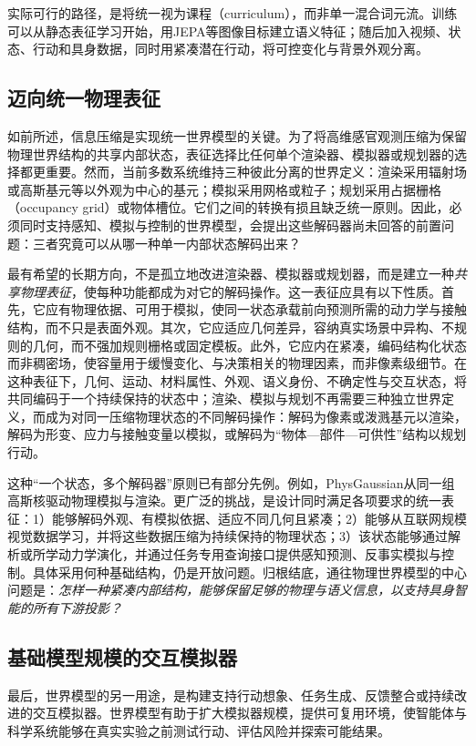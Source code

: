 实际可行的路径，是将统一视为课程（curriculum），而非单一混合词元流。训练可以从静态表征学习开始，用JEPA等图像目标建立语义特征\citep{assran2023ijepa}；随后加入视频、状态、行动和具身数据，同时用紧凑潜在行动，将可控变化与背景外观分离\citep{bruce2024genie,bi2025motus}。

\subsection{迈向统一物理表征}
如前所述，信息压缩是实现统一世界模型的关键。为了将高维感官观测压缩为保留物理世界结构的共享内部状态，表征选择比任何单个渲染器、模拟器或规划器的选择都更重要。然而，当前多数系统维持三种彼此分离的世界定义：渲染采用辐射场或高斯基元等以外观为中心的基元\citep{mildenhall2020nerf,kerbl20233dgaussians}；模拟采用网格或粒子；规划采用占据栅格（occupancy grid）或物体槽位。它们之间的转换有损且缺乏统一原则。因此，必须同时支持感知、模拟与控制的世界模型，会提出这些解码器尚未回答的前置问题：三者究竟可以从哪一种单一内部状态解码出来？

最有希望的长期方向，不是孤立地改进渲染器、模拟器或规划器，而是建立一种\emph{共享物理表征}，使每种功能都成为对它的解码操作。这一表征应具有以下性质。首先，它应有物理依据、可用于模拟，使同一状态承载前向预测所需的动力学与接触结构，而不只是表面外观。其次，它应适应几何差异，容纳真实场景中异构、不规则的几何，而不强加规则栅格或固定模板。此外，它应内在紧凑，编码结构化状态而非稠密场，使容量用于缓慢变化、与决策相关的物理因素，而非像素级细节。在这种表征下，几何、运动、材料属性、外观、语义身份、不确定性与交互状态，将共同编码于一个持续保持的状态中；渲染、模拟与规划不再需要三种独立世界定义，而成为对同一压缩物理状态的不同解码操作：解码为像素或泼溅基元以渲染，解码为形变、应力与接触变量以模拟，或解码为“物体—部件—可供性”结构以规划行动。

这种“一个状态，多个解码器”原则已有部分先例。例如，PhysGaussian\citep{xie2024physgaussian}从同一组高斯核驱动物理模拟与渲染。更广泛的挑战，是设计同时满足各项要求的统一表征：1）能够解码外观、有模拟依据、适应不同几何且紧凑；2）能够从互联网规模视觉数据学习，并将这些数据压缩为持续保持的物理状态；3）该状态能够通过解析或所学动力学演化，并通过任务专用查询接口提供感知预测、反事实模拟与控制。具体采用何种基础结构，仍是开放问题。归根结底，通往物理世界模型的中心问题是：\textit{怎样一种紧凑内部结构，能够保留足够的物理与语义信息，以支持具身智能的所有下游投影？}

\subsection{基础模型规模的交互模拟器}
最后，世界模型的另一用途，是构建支持行动想象、任务生成、反馈整合或持续改进的交互模拟器。世界模型有助于扩大模拟器规模，提供可复用环境，使智能体与科学系统能够在真实实验之前测试行动、评估风险并探索可能结果。

